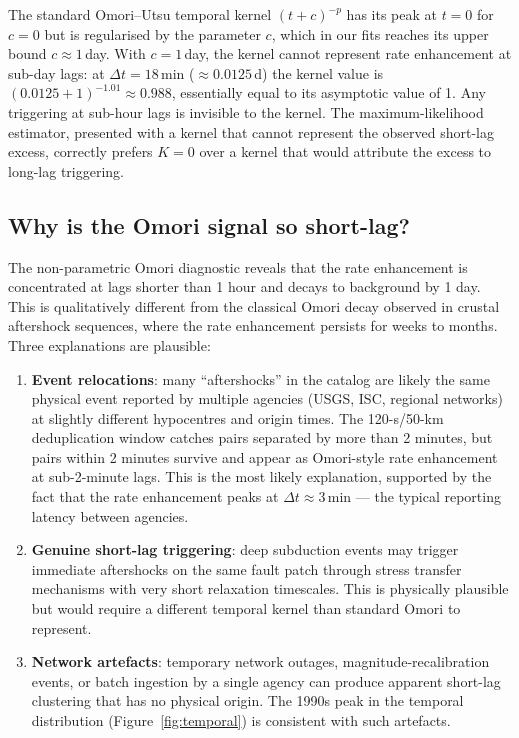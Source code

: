 \documentclass[10pt,a4paper,twocolumn]{article}
\begin{document}
The standard Omori--Utsu temporal kernel $(t+c)^{-p}$ has its peak at $t=0$ for $c=0$ but is regularised by the parameter $c$, which in our fits reaches its upper bound $c\approx1$\,day. With $c=1$\,day, the kernel cannot represent rate enhancement at sub-day lags: at $\Delta t=18$\,min ($\approx0.0125$\,d) the kernel value is $(0.0125 + 1)^{-1.01} \approx 0.988$, essentially equal to its asymptotic value of 1. Any triggering at sub-hour lags is invisible to the kernel. The maximum-likelihood estimator, presented with a kernel that cannot represent the observed short-lag excess, correctly prefers $K=0$ over a kernel that would attribute the excess to long-lag triggering.

\subsection{Why is the Omori signal so short-lag?}

The non-parametric Omori diagnostic reveals that the rate enhancement is concentrated at lags shorter than 1 hour and decays to background by 1 day. This is qualitatively different from the classical Omori decay observed in crustal aftershock sequences, where the rate enhancement persists for weeks to months. Three explanations are plausible:

\begin{enumerate}[leftmargin=1.2em,itemsep=2pt,topsep=2pt]
\item \textbf{Event relocations}: many ``aftershocks'' in the catalog are likely the same physical event reported by multiple agencies (USGS, ISC, regional networks) at slightly different hypocentres and origin times. The 120-s/50-km deduplication window catches pairs separated by more than 2 minutes, but pairs within 2 minutes survive and appear as Omori-style rate enhancement at sub-2-minute lags. This is the most likely explanation, supported by the fact that the rate enhancement peaks at $\Delta t\approx3$\,min --- the typical reporting latency between agencies.
\item \textbf{Genuine short-lag triggering}: deep subduction events may trigger immediate aftershocks on the same fault patch through stress transfer mechanisms with very short relaxation timescales. This is physically plausible but would require a different temporal kernel than standard Omori to represent.
\item \textbf{Network artefacts}: temporary network outages, magnitude-recalibration events, or batch ingestion by a single agency can produce apparent short-lag clustering that has no physical origin. The 1990s peak in the temporal distribution (Figure~\ref{fig:temporal}) is consistent with such artefacts.
\end{enumerate}
\end{document}
